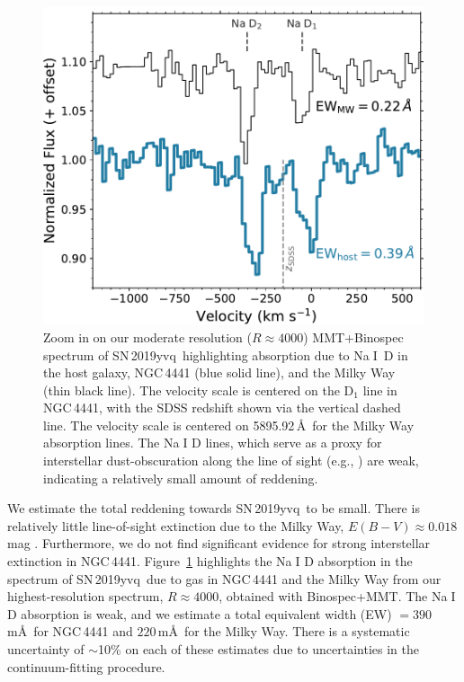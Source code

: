 \documentclass[twocolumn]{aastex63}
\def\ion#1#2{#1$\;${\footnotesize\rm{#2}}\relax}
\newcommand{\sn}{SN\,2019yvq}
\begin{document}
\begin{figure} \centering \includegraphics[width=\columnwidth]{./figures/NaD.pdf}
    \caption{Zoom in on our moderate resolution ($R \approx 4000$)
    MMT+Binospec spectrum of \sn\ highlighting absorption due to \ion{Na}{I}~D
    in the host galaxy, NGC\,4441 (blue solid line), and the Milky Way (thin
    black line). The velocity scale is centered on the D$_1$ line in
    NGC\,4441, with the SDSS redshift shown via the vertical dashed line. The
    velocity scale is centered on 5895.92\,\AA\ for the Milky Way absorption
    lines. The \ion{Na}{I} D lines, which serve as a proxy for interstellar
    dust-obscuration along the line of sight (e.g.,
    \citealt{Poznanski12,Phillips13}) are weak, indicating a relatively small
    amount of reddening.}
    \label{fig:NaD}
\end{figure}

We estimate the total reddening towards \sn\ to be small. There is relatively
little line-of-sight extinction due to the Milky Way, $E(B-V) \approx
0.018$\,mag \citep{Schlafly11, Schlegel98}. Furthermore, we do not find
significant evidence for strong interstellar extinction in NGC\,4441.
Figure~\ref{fig:NaD} highlights the \ion{Na}{I} D absorption in the spectrum
of \sn\ due to gas in NGC\,4441 and the Milky Way from our highest-resolution
spectrum, $R \approx 4000$, obtained with Binospec+MMT. The \ion{Na}{I} D
absorption is weak, and we estimate a total equivalent width (EW) $=
390$\,m\AA\ for NGC\,4441 and $220$\,m\AA\ for the Milky Way. There is a
systematic uncertainty of $\sim$10\% on each of these estimates due to
uncertainties in the continuum-fitting procedure. 
\end{document}
